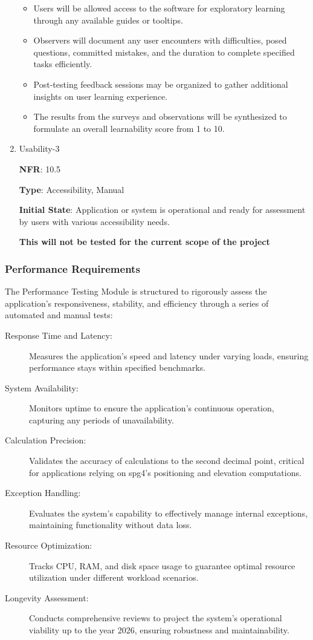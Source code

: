 \documentclass[12pt, titlepage]{article}
\begin{document}
\begin{enumerate}
\begin{itemize}
    \item Users will be allowed access to the software for exploratory learning through any available guides or tooltips.
    \item Observers will document any user encounters with difficulties, posed questions, committed mistakes, and the duration to complete specified tasks efficiently.
    \item Post-testing feedback sessions may be organized to gather additional insights on user learning experience.
    \item The results from the surveys and observations will be synthesized to formulate an overall learnability score from 1 to 10.
\end{itemize}

\item{Usability-3\\}

\textbf{NFR}: 10.5

\textbf{Type}: Accessibility, Manual

\textbf{Initial State}: Application or system is operational and ready for assessment by users with various accessibility needs.

\textbf{This will not be tested for the current scope of the project}

\end{enumerate}

\subsubsection{Performance Requirements}

The Performance Testing Module is structured to rigorously assess the application's responsiveness, stability, and efficiency through a series of automated and manual tests:

\begin{description}
    \item[Response Time and Latency:] Measures the application's speed and latency under varying loads, ensuring performance stays within specified benchmarks.
    \item[System Availability:] Monitors uptime to ensure the application's continuous operation, capturing any periods of unavailability.
    \item[Calculation Precision:] Validates the accuracy of calculations to the second decimal point, critical for applications relying on spg4's positioning and elevation computations.
    \item[Exception Handling:] Evaluates the system's capability to effectively manage internal exceptions, maintaining functionality without data loss.
    \item[Resource Optimization:] Tracks CPU, RAM, and disk space usage to guarantee optimal resource utilization under different workload scenarios.
    \item[Longevity Assessment:] Conducts comprehensive reviews to project the system's operational viability up to the year 2026, ensuring robustness and maintainability.
\end{description}
\end{document}
